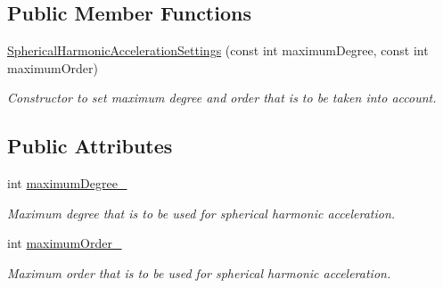 \subsection*{Public Member Functions}
\begin{DoxyCompactItemize}
\item 
\hyperlink{classtudat_1_1simulation__setup_1_1SphericalHarmonicAccelerationSettings_ae66b96974a61810c238a4953cc03e376}{Spherical\+Harmonic\+Acceleration\+Settings} (const int maximum\+Degree, const int maximum\+Order)
\begin{DoxyCompactList}\small\item\em Constructor to set maximum degree and order that is to be taken into account. \end{DoxyCompactList}\end{DoxyCompactItemize}
\subsection*{Public Attributes}
\begin{DoxyCompactItemize}
\item 
int \hyperlink{classtudat_1_1simulation__setup_1_1SphericalHarmonicAccelerationSettings_aa6862878fa2d620eb2ef8057ea36b7c5}{maximum\+Degree\+\_\+}\hypertarget{classtudat_1_1simulation__setup_1_1SphericalHarmonicAccelerationSettings_aa6862878fa2d620eb2ef8057ea36b7c5}{}\label{classtudat_1_1simulation__setup_1_1SphericalHarmonicAccelerationSettings_aa6862878fa2d620eb2ef8057ea36b7c5}

\begin{DoxyCompactList}\small\item\em Maximum degree that is to be used for spherical harmonic acceleration. \end{DoxyCompactList}\item 
int \hyperlink{classtudat_1_1simulation__setup_1_1SphericalHarmonicAccelerationSettings_aca67e705de784fd8bd54a3bba24f91c0}{maximum\+Order\+\_\+}\hypertarget{classtudat_1_1simulation__setup_1_1SphericalHarmonicAccelerationSettings_aca67e705de784fd8bd54a3bba24f91c0}{}\label{classtudat_1_1simulation__setup_1_1SphericalHarmonicAccelerationSettings_aca67e705de784fd8bd54a3bba24f91c0}

\begin{DoxyCompactList}\small\item\em Maximum order that is to be used for spherical harmonic acceleration. \end{DoxyCompactList}\end{DoxyCompactItemize}


